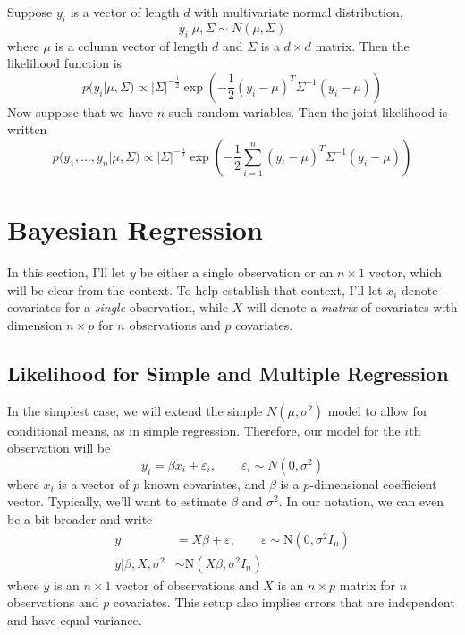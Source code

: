 \documentclass[12pt]{article}
\begin{document}
Suppose $y_i$ is a vector of length $d$ with multivariate normal
distribution, 
   \[ y_i | \mu, \Sigma \sim N(\mu, \Sigma) \]
where $\mu$ is a column vector of length $d$ and $\Sigma$ is a
$d\times d$ matrix.  Then the likelihood function is 
   \[ p(y_i |\mu,\Sigma) \propto |\Sigma|^{-\frac{1}{2}} 
   \exp \left( -\frac{1}{2}(y_i-\mu)^T \Sigma^{-1} (y_i-\mu)\right)\]
Now suppose that we have $n$ such random variables. Then the joint
likelihood is written
   \[ p(y_1, \ldots, y_n | \mu, \Sigma) \propto 
      |\Sigma|^{-\frac{n}{2}}
      \exp \left( -\frac{1}{2} \sum_{i=1}^n
      (y_i-\mu)^T \Sigma^{-1} (y_i-\mu)\right)\]






\newpage
\section{Bayesian Regression}

In this section, I'll let $y$ be either a single observation or an
$n\times1$ vector, which will be clear from the context. To help 
establish that context, I'll let $x_i$ denote covariates for a 
\emph{single} observation, while $X$ will denote a \emph{matrix}
of covariates with dimension $n\times p$ for $n$ observations and
$p$ covariates.


\subsection{Likelihood for Simple and Multiple Regression}

In the simplest case, we will extend the simple $N(\mu,\sigma^2)$ model
to allow for conditional means, as in simple regression. 
Therefore, our model for the $i$th observation will be
\[ y_i = \beta x_i + \varepsilon_i, \qquad 
   \varepsilon_i \sim N(0,\sigma^2) \]
where $x_i$ is a vector of $p$ known covariates, and $\beta$ is a 
$p$-dimensional coefficient vector. Typically, we'll want to estimate
$\beta$ and $\sigma^2$. In our notation, we can even be a bit broader
and write
\begin{align*}
    y &= X \beta  + \varepsilon, \qquad  \varepsilon \sim 
      \text{N}(0, \sigma^2 I_n) \\  
      y| \beta, X, \sigma^2 &\sim \text{N}(X\beta, \sigma^2 I_n) 
\end{align*}
where $y$ is an $n\times1$ vector of observations and
$X$ is an $n\times p$ matrix for $n$ observations and $p$
covariates. This setup also implies errors that are 
independent and have equal variance. 
\end{document}
